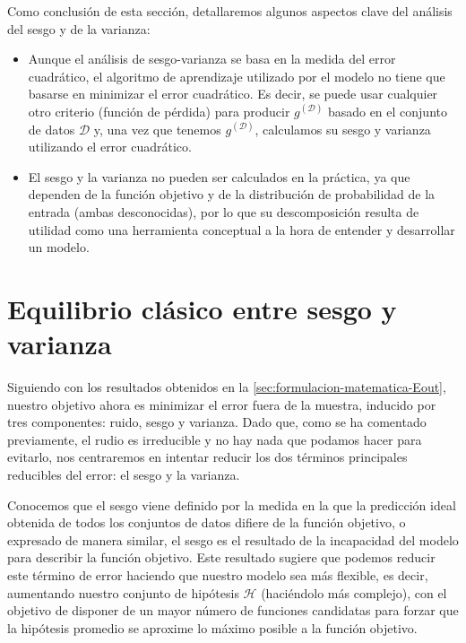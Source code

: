 Como conclusión de esta sección, detallaremos algunos aspectos clave del análisis del sesgo y de la varianza:

\begin{itemize}
    \item Aunque el análisis de sesgo-varianza se basa en la medida del error cuadrático, el algoritmo de aprendizaje utilizado por el modelo no tiene que basarse en minimizar el error cuadrático. Es decir, se puede usar cualquier otro criterio (función de pérdida) para producir $g^{\mathcal{(D)}}$ basado en el conjunto de datos $\mathcal{D}$ y, una vez que tenemos $g^{\mathcal{(D)}}$, calculamos su sesgo y varianza utilizando el error cuadrático.
    \item El sesgo y la varianza no pueden ser calculados en la práctica, ya que dependen de la función objetivo y de la distribución de probabilidad de la entrada (ambas desconocidas), por lo que su descomposición resulta de utilidad como una herramienta conceptual a la hora de entender y desarrollar un modelo.\newline
    
\end{itemize}

\section{Equilibrio clásico entre sesgo y varianza}\label{sec:equilibrio-sesgo-varianza}
Siguiendo con los resultados obtenidos en la \autoref{sec:formulacion-matematica-Eout}, nuestro objetivo ahora es minimizar el error fuera de la muestra, inducido por tres componentes: ruido, sesgo y varianza. Dado que, como se ha comentado previamente, el rudio es irreducible y no hay nada que podamos hacer para evitarlo, nos centraremos en intentar reducir los dos términos principales reducibles del error: el sesgo y la varianza.\newline

Conocemos que el sesgo viene definido por la medida en la que la predicción ideal obtenida de todos los conjuntos de datos difiere de la función objetivo, o expresado de manera similar, el sesgo es el resultado de la incapacidad del modelo para describir la función objetivo. Este resultado sugiere que podemos reducir este término de error haciendo que nuestro modelo sea más flexible, es decir, aumentando nuestro conjunto de hipótesis $\mathcal{H}$ (haciéndolo más complejo), con el objetivo de disponer de un mayor número de funciones candidatas para forzar que la hipótesis promedio se aproxime lo máximo posible a la función objetivo.\newline

